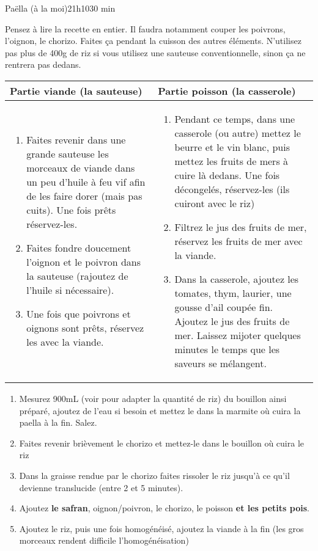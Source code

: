 {\begin{recette}{Paëlla (à la moi)}{2}{1h10}{30 min}
\begin{preparation*}
Pensez à lire la recette en entier. Il faudra notamment couper les poivrons, l'oignon, le chorizo. Faites ça pendant la cuisson 
des autres éléments. N'utilisez pas plus de 400g de riz si vous utilisez une sauteuse conventionnelle, sinon ça ne rentrera pas 
dedans.

\begin{tabular}{p{}|p{}}
Partie viande (la sauteuse)& Partie poisson (la casserole)\\\hline
\begin{enumerate}
\item Faites revenir dans une grande sauteuse les morceaux de viande dans un peu d'huile à feu vif afin de les faire dorer (mais 
pas cuits). Une fois prêts réservez-les.
\item Faites fondre doucement l'oignon et le poivron dans la sauteuse (rajoutez de l'huile si nécessaire).
\item Une fois que poivrons et oignons sont prêts, réservez les avec la viande.
\end{enumerate}&\begin{enumerate}
\item Pendant ce temps, dans une casserole (ou autre) mettez le beurre et le vin blanc, puis mettez les fruits de mers à cuire 
là dedans. Une fois décongelés, réservez-les (ils cuiront avec le riz)
\item Filtrez le jus des fruits de mer, réservez les fruits de mer avec la viande. 
\item Dans la casserole, ajoutez les tomates, thym, laurier, une gousse d'ail coupée fin. Ajoutez le jus des fruits de mer. Laissez mijoter quelques minutes le temps que les saveurs se mélangent.
\end{enumerate}
\end{tabular}
\begin{enumerate}
\item Mesurez 900mL (voir  pour adapter la quantité de riz) du bouillon ainsi préparé, ajoutez de l'eau si besoin et mettez le dans la marmite où cuira la paella à la fin. Salez.
\item Faites revenir brièvement le chorizo et mettez-le dans le bouillon où cuira le riz
\item Dans la graisse rendue par le chorizo faites rissoler le riz jusqu'à ce qu'il devienne translucide (entre 2 et 5 minutes). 
\item Ajoutez \textbf{le safran}, oignon/poivron, le 
chorizo, le poisson \textbf{et les petits pois}.
\item Ajoutez le riz, puis une fois homogénéisé, ajoutez la viande à la fin (les gros morceaux rendent difficile l'homogénéisation)
\end{enumerate}
\end{preparation*}


\end{recette}}
